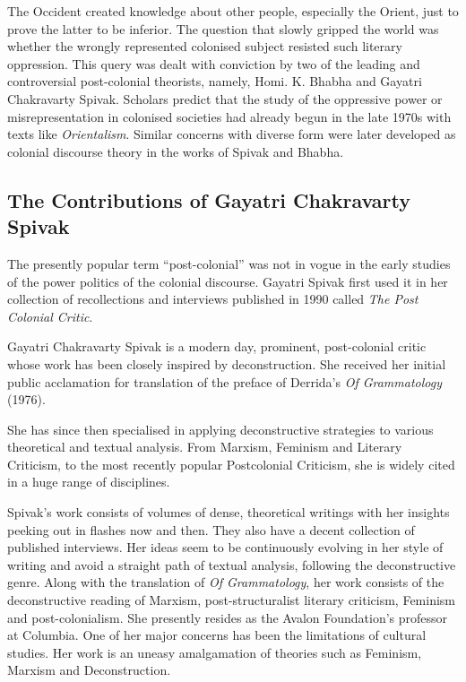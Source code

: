 The Occident created knowledge about other people, especially the Orient, just to prove the latter to be inferior. The question that slowly gripped the world was whether the wrongly represented colonised subject resisted such literary oppression. This query was dealt with conviction by two of the leading and controversial post-colonial theorists, namely, Homi. K. Bhabha and Gayatri Chakravarty Spivak. Scholars predict that the study of the oppressive power or misrepresentation in colonised societies had already begun in the late 1970s with texts like \emph{Orientalism}. Similar concerns with diverse form were later developed as colonial discourse theory in the works of Spivak and Bhabha. 

\subsection{The Contributions of Gayatri Chakravarty Spivak}

The presently popular term “post-colonial” was not in vogue in the early studies of the power politics of the colonial discourse. Gayatri Spivak first used it in her collection of recollections and interviews published in 1990 called \emph{The Post Colonial Critic}.

Gayatri Chakravarty Spivak is a modern day, prominent, post-colonial critic whose work has been closely inspired by deconstruction. She received her initial public acclamation for translation of the preface of Derrida’s \emph{Of Grammatology} (1976).

She has since then specialised in applying deconstructive strategies to various theoretical and textual analysis. From Marxism, Feminism and Literary Criticism, to the most recently popular Postcolonial Criticism, she is widely cited in a huge range of disciplines.

Spivak’s work consists of volumes of dense, theoretical writings with her insights peeking out in flashes now and then. They also have a decent collection of published interviews. Her ideas seem to be continuously evolving in her style of writing and avoid a straight path of textual analysis, following the deconstructive genre. Along with the translation of \emph{Of Grammatology}, her work consists of the deconstructive reading of Marxism, post-structuralist literary criticism, Feminism and post-colonialism. She presently resides as the Avalon Foundation’s professor at Columbia. One of her major concerns has been the limitations of cultural studies. Her work is an uneasy amalgamation of theories such as Feminism, Marxism and Deconstruction. 


